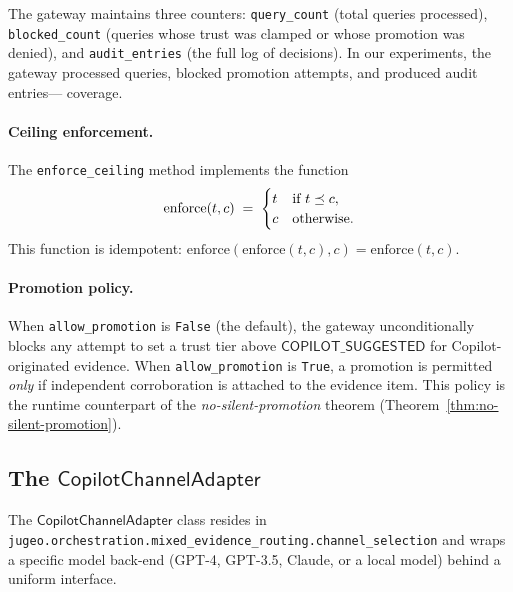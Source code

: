 \documentclass[11pt]{article}
\newcommand{\CopAdapt}{\mathsf{CopilotChannelAdapter}}
\newcommand{\TrustCeil}{\mathsf{COPILOT\_SUGGESTED}}
\newcommand{\enforce}{\mathrm{enforce}}
\newcommand{\enforceCeil}{\texttt{enforce\_ceiling}}
\begin{document}
The gateway maintains three counters:
\texttt{query\_count} (total queries processed),
\texttt{blocked\_count} (queries whose trust was clamped or
whose promotion was denied), and \texttt{audit\_entries}
(the full log of decisions).  In our experiments, the gateway
processed \ppLXXXVIIIauditQueries{} queries, blocked
\ppLXXXVIIIauditBlocked{} promotion attempts, and produced
\ppLXXXVIIIauditEntries{} audit entries---\ppLXXXVIIIauditComplete{}
coverage.

\paragraph{Ceiling enforcement.}
The \enforceCeil{} method implements the function
\[
  \enforce(t, c) \;=\;
  \begin{cases}
    t & \text{if } t \tleq c, \\
    c & \text{otherwise.}
  \end{cases}
\]
This function is idempotent: $\enforce(\enforce(t,c),c) = \enforce(t,c)$.

\paragraph{Promotion policy.}
When \texttt{allow\_promotion} is \texttt{False} (the default),
the gateway unconditionally blocks any attempt to set a trust
tier above $\TrustCeil$ for Copilot-originated evidence.
When \texttt{allow\_promotion} is \texttt{True}, a promotion
is permitted \emph{only} if independent corroboration is
attached to the evidence item.  This policy is the runtime
counterpart of the \emph{no-silent-promotion} theorem
(Theorem~\ref{thm:no-silent-promotion}).

\subsection{The \texorpdfstring{$\CopAdapt$}{CopilotChannelAdapter}}
\label{sec:gateway:adapter}

The $\CopAdapt$ class resides in
\texttt{jugeo.orchestration.mixed\_evidence\_routing.channel\_selection}
and wraps a specific model back-end (GPT-4, GPT-3.5, Claude, or a
local model) behind a uniform interface.
\end{document}
